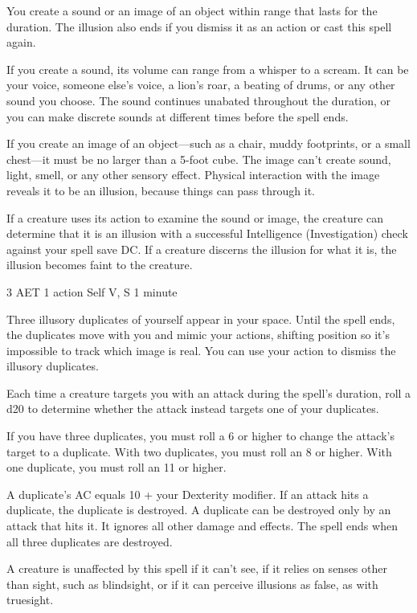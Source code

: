 You create a sound or an image of an object within range that lasts for the duration. The illusion also ends if you dismiss it as an action or cast this spell again.

If you create a sound, its volume can range from a whisper to a scream. It can be your voice, someone else's voice, a lion's roar, a beating of drums, or any other sound you choose. The sound continues unabated throughout the duration, or you can make discrete sounds at different times before the spell ends.

If you create an image of an object—such as a chair, muddy footprints, or a small chest—it must be no larger than a 5-foot cube. The image can't create sound, light, smell, or any other sensory effect. Physical interaction with the image reveals it to be an illusion, because things can pass through it.

If a creature uses its action to examine the sound or image, the creature can determine that it is an illusion with a successful Intelligence (Investigation) check against your spell save DC. If a creature discerns the illusion for what it is, the illusion becomes faint to the creature.

\label{spell:mirror-image}
{3 AET}
{1 action}
{Self}
{V, S}
{1 minute}

Three illusory duplicates of yourself appear in your space. Until the spell ends, the duplicates move with you and mimic your actions, shifting position so it's impossible to track which image is real. You can use your action to dismiss the illusory duplicates.

Each time a creature targets you with an attack during the spell's duration, roll a d20 to determine whether the attack instead targets one of your duplicates.

If you have three duplicates, you must roll a 6 or higher to change the attack's target to a duplicate. With two duplicates, you must roll an 8 or higher. With one duplicate, you must roll an 11 or higher.

A duplicate's AC equals 10 + your Dexterity modifier. If an attack hits a duplicate, the duplicate is destroyed. A duplicate can be destroyed only by an attack that hits it. It ignores all other damage and effects. The spell ends when all three duplicates are destroyed.

A creature is unaffected by this spell if it can't see, if it relies on senses other than sight, such as blindsight, or if it can perceive illusions as false, as with truesight.

